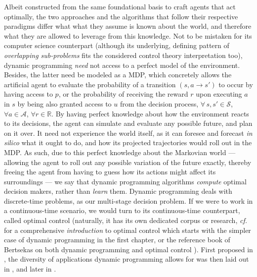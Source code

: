 Albeit constructed from the same foundational basis to craft agents that act optimally,
the two approaches and the algorithms that follow their respective paradigms differ what what they assume
is known about the world, and therefore what they are allowed to leverage from this knowledge.
Not to be mistaken for its computer science counterpart
(although its underlying, defining pattern of \textit{overlapping sub-problems}
fits the considered control theory interpretation too),
dynamic programming \emph{need} not access to a perfect model of the environment.
Besides, the latter need be modeled as a MDP,
which concretely allows the artificial agent to evaluate the probability of a transition $(s,a \to s')$
to occur by having access to $p$, or the probability of receiving the reward $r$ upon executing $a$ in $s$
by being also granted access to $u$ from the decision process,
$\forall \, s, s' \in \mathcal{S}$, $\forall a \in \mathcal{A}$, $\forall r \in \mathbb{R}$.
By having perfect knowledge about how the environment reacts to its decisions,
the agent can simulate and evaluate any possible future, and plan on it over.
It need not experience the world itself, as it can foresee and forecast \textit{in silico} what it ought to do,
and how its projected trajectories would roll out in the MDP.
As such, due to this perfect knowledge about the Markovian world ---
allowing the agent to roll out any possible variation of the future exactly, thereby
freeing the agent from having to guess how its actions might affect its surroundings ---
we say that dynamic programming algorithms \emph{compute} optimal decision makers,
rather than \emph{learn} them.
Dynamic programming deals with discrete-time problems, as our multi-stage decision problem.
If we were to work in a continuous-time scenario, we would turn to its continuous-time counterpart,
called optimal control (naturally, it has its own dedicated corpus or research,
\textit{cf.} \cite{Kirk2004-dq} for a comprehensive \textit{introduction} to optimal control
which starts with the simpler case of dynamic programming in the first chapter,
or the reference book of Bertsekas on both dynamic programming and optimal control \cite{Bertsekas2000-yi}).
First proposed in \cite{Bellman1957-om}, the diversity of applications dynamic programming allows for was then
laid out in \cite{Bellman1962-oi}, and later in \cite{Dreyfus1977-fv}.

